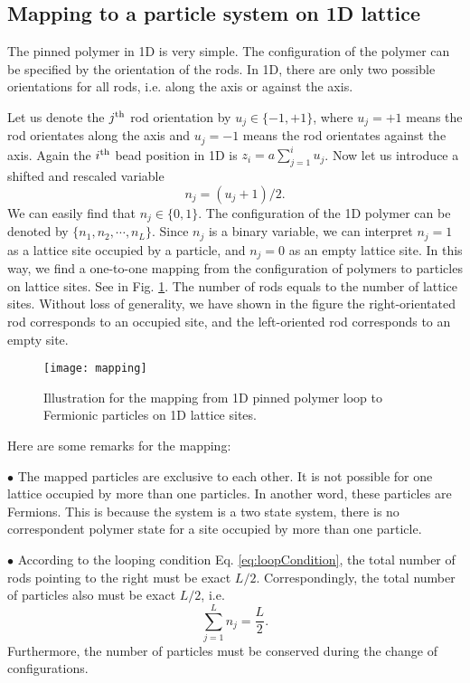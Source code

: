 \subsection{Mapping to a particle system on 1D lattice}
\label{sub:mapping_to_a_particle_system_on_1d_lattice}

The pinned polymer in 1D is very simple. The configuration of the polymer can be specified by the orientation of the rods. In 1D, there are only two possible orientations for all rods, i.e. along the axis or against the axis. 

Let us denote the $j^{\rm{th}}$ rod orientation by $u_j\in\{-1, +1\}$, where $u_j = +1$ means the rod orientates along the axis and $u_j = -1$ means the rod orientates against the axis. Again the $i^{\rm{th}}$ bead position in 1D is $z_i = a\sum_{j=1}^{i}u_j$. Now let us introduce a shifted and rescaled variable 
\begin{equation}
    \label{eq:variableu2n}
    n_j = (u_j + 1)/2. 
\end{equation}
We can easily find that $n_j\in\{0,1\}$. The configuration of the 1D polymer can be denoted by $\{n_1, n_2, \cdots, n_L\}$. Since $n_j$ is a binary variable, we can interpret $n_j = 1$ as a lattice site occupied by a particle, and $n_j = 0$ as an empty lattice site. In this way, we find a one-to-one mapping from the configuration of polymers to particles on lattice sites. See in Fig. \ref{fig:mapping}. The number of rods equals to the number of lattice sites. Without loss of generality, we have shown in the figure the right-orientated rod corresponds to an occupied site, and the left-oriented rod corresponds to an empty site.

\begin{figure}[htpb]
    \centering
    \texttt{[image: mapping]}
    \caption{Illustration for the mapping from 1D pinned polymer loop to Fermionic particles on 1D lattice sites. }
    \label{fig:mapping}
\end{figure}

Here are some remarks for the mapping:

$\bullet$ The mapped particles are exclusive to each other. It is not possible for one lattice occupied by more than one particles. In another word, these particles are Fermions. This is because the system is a two state system, there is no correspondent polymer state for a site occupied by more than one particle.

$\bullet$ According to the looping condition Eq. \eqref{eq:loopCondition}, the total number of rods pointing to the right must be exact $L/2$. Correspondingly, the total number of particles also must be exact $L/2$, i.e.
\begin{equation}
    \label{eq:loopConditionParticle}
    \sum_{j=1}^{L}{n_j} = \frac{L}{2}.
\end{equation}
Furthermore, the number of particles must be conserved during the change of configurations.

